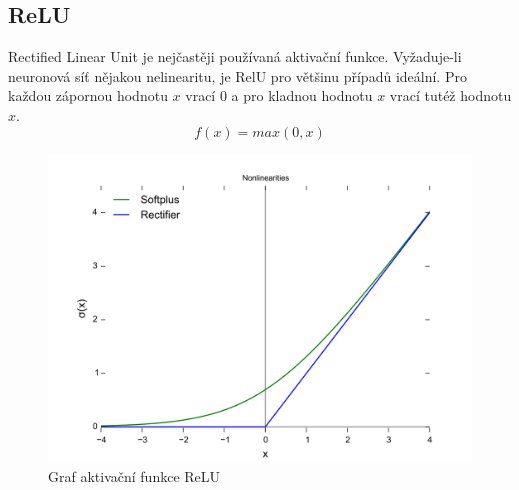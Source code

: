 \subsection*{ReLU}
Rectified Linear Unit je nejčastěji používaná aktivační funkce. Vyžaduje-li neuronová síť nějakou nelinearitu, je RelU pro většinu případů ideální. Pro každou zápornou hodnotu $x$ vrací $0$ a pro kladnou hodnotu $x$ vrací tutéž hodnotu $x$.
\begin{equation}
   f(x)=max(0,x)
\end{equation}
\begin{figure}[H]
    \centering
    \includegraphics[scale=0.2]{obrazky-figures/ReLU.png}
    \caption{\label{fig:relu}Graf aktivační funkce ReLU}
\end{figure}


